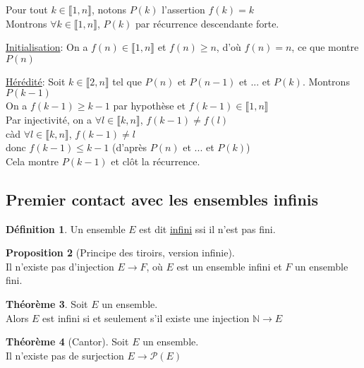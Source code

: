 \documentclass[10pt,a4paper]{article}
\theoremstyle{definition}
\newtheorem{proposition}{Proposition}[section]
\newtheorem{theorem}[proposition]{Théorème}
\newtheorem{definition}[proposition]{Définition}
\begin{document}
\noindent Pour tout $k \in \llbracket 1, n \rrbracket$, notons $P(k)$ l'assertion $f(k) = k$ \\
Montrons $\forall k \in \llbracket 1, n \rrbracket$, $P(k)$ par récurrence descendante forte. \medskip

\noindent \uline{Initialisation}: On a $f(n) \in \llbracket 1, n \rrbracket$ et $f(n) \geq n$, d'où $f(n) = n$, ce que montre $P(n)$ \medskip

\noindent \uline{Hérédité}: Soit $k \in \llbracket 2, n \rrbracket$ tel que $P(n)$ et $P(n - 1)$ et ... et $P(k)$. Montrons $P(k - 1)$ \\
On a $f(k - 1) \geq k - 1$ par hypothèse et $f(k - 1) \in \llbracket 1, n \rrbracket$ \\
Par injectivité, on a $\forall l \in \llbracket k, n \rrbracket$, $f(k - 1) \neq f(l)$ \\
càd $\forall l \in \llbracket k, n \rrbracket$, $f(k - 1) \neq l$ \\
donc $f(k - 1) \leq k - 1$ (d'après $P(n)$ et ... et $P(k)$) \\
Cela montre $P(k - 1)$ et clôt la récurrence.

\subsection{Premier contact avec les ensembles infinis}
\begin{definition}
Un ensemble $E$ est dit \uline{infini} ssi il n'est pas fini.
\end{definition}
\begin{proposition}[Principe des tiroirs, version infinie]
\hfill \\
Il n'existe pas d'injection $E \to F$, où $E$ est un ensemble infini et $F$ un ensemble fini.
\end{proposition}
\begin{theorem}
Soit $E$ un ensemble. \\
Alors $E$ est infini si et seulement s'il existe une injection $\mathbb{N} \to E$
\end{theorem}
\begin{theorem}[Cantor]
Soit $E$ un ensemble. \\
Il n'existe pas de surjection $E \to \mathcal{P}(E)$
\end{theorem}
\end{document}
